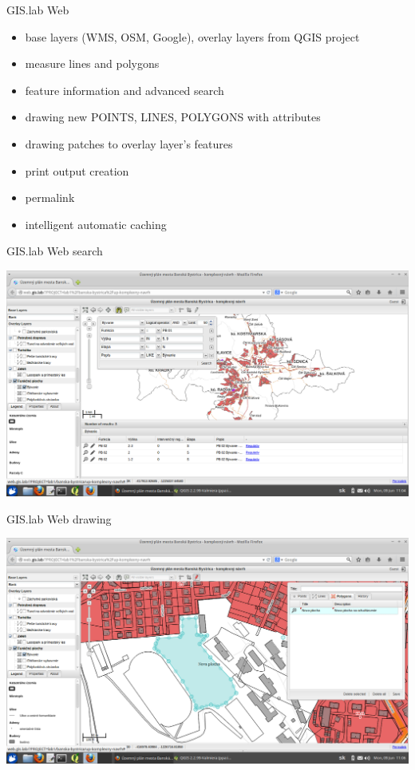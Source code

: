 \documentclass[12pt]{beamer}
\begin{document}
\begin{frame}{GIS.lab Web}
	\begin{itemize}[<+->]
		\item base layers (WMS, OSM, Google), overlay layers from QGIS project
		\item measure lines and polygons
		\item feature information and advanced search
		\item drawing new POINTS, LINES, POLYGONS with attributes
		\item drawing patches to overlay layer's features
		\item print output creation
		\item permalink
		\item intelligent automatic caching
	\end{itemize}
\end{frame}


\begin{frame}{GIS.lab Web search}
	\begin{center}
		\includegraphics[keepaspectratio=true,height=0.7\textheight]{images/real-world-example/project-gislab-web-search.png}
	\end{center}
\end{frame}


\begin{frame}{GIS.lab Web drawing}
	\begin{center}
		\includegraphics[keepaspectratio=true,height=0.7\textheight]{images/real-world-example/project-gislab-web-drawing.png}
	\end{center}
\end{frame}
\end{document}
